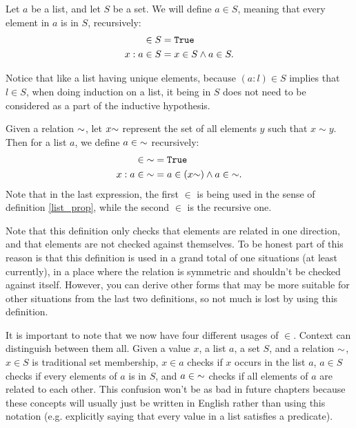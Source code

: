 \documentclass[../math.tex]{subfiles}
\begin{document}
\begin{definition} \label{list_prop}
    Let $a$ be a list, and let $S$ be a set.  We will define $a \in S$, meaning
    that every element in $a$ is in $S$, recursively:
    \begin{align*}
           [] \in S &= \vtt{True} \\
        x : a \in S &= x \in S \wedge a \in S.
    \end{align*}
\end{definition}
\noindent Notice that like a list having unique elements, because $(a : l) \in
S$ implies that $l \in S$, when doing induction on a list, it being in $S$ does
not need to be considered as a part of the inductive hypothesis.

\begin{definition}
    Given a relation ${\sim}$, let $x {\sim}$ represent the set of all elements
    $y$ such that $x \sim y$.  Then for a list $a$, we define $a \in {\sim}$
    recursively:
    \begin{align*}
           [] \in \usim &= \vtt{True} \\
        x : a \in \usim &= a \in (x \usim) \wedge a \in \usim.
    \end{align*}
    Note that in the last expression, the first $\in$ is being used in the sense
    of definition \ref{list_prop}, while the second $\in$ is the recursive one.
\end{definition}

Note that this definition only checks that elements are related in one
direction, and that elements are not checked against themselves.  To be honest
part of this reason is that this definition is used in a grand total of one
situations (at least currently), in a place where the relation is symmetric and
shouldn't be checked against itself.  However, you can derive other forms that
may be more suitable for other situations from the last two definitions, so not
much is lost by using this definition.

It is important to note that we now have four different usages of $\in$.
Context can distinguish between them all.  Given a value $x$, a list $a$, a set
$S$, and a relation ${\sim}$, $x \in S$ is traditional set membership, $x \in a$
checks if $x$ occurs in the list $a$, $a \in S$ checks if every elements of $a$
is in $S$, and $a \in {\sim}$ checks if all elements of $a$ are related to each
other.  This confusion won't be as bad in future chapters because these concepts
will usually just be written in English rather than using this notation (e.g.
explicitly saying that every value in a list satisfies a predicate).
\end{document}
